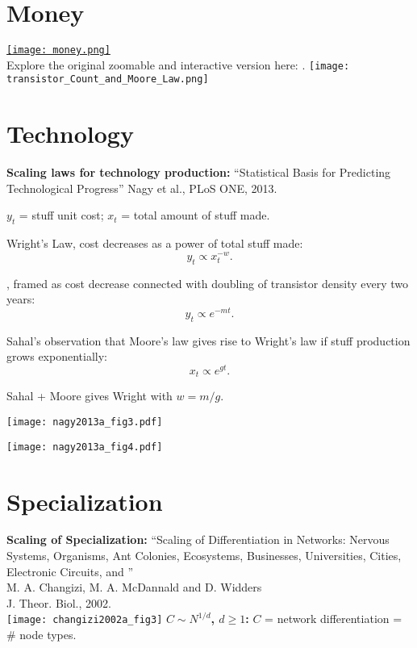 \section{Money}
  
  \href{http://xkcd.com/980/}{
    \texttt{[image: money.png]}
  }\\
  Explore the original zoomable and  interactive version here: 
  .
  \textbf{}
    \texttt{[image: transistor\_Count\_and\_Moore\_Law.png]}
\section{Technology}
  \small

  \textbf{Scaling laws for technology production:}
      ``Statistical Basis for Predicting Technological Progress\cite{nagy2013a}''
      Nagy et al., PLoS ONE, 2013.
    
      $y_t$ = stuff unit cost;
      $x_t$ = total amount of stuff made.
    
      Wright's Law, cost decreases as a power of total stuff made:\cite{wright1936a}
      $$ 
      y_t \propto x_t^{-w}.
      $$
     
      ,
      framed as cost decrease 
      connected with doubling of transistor density every two years:\cite{moore1965a}
      $$
      y_t \propto e^{- m t}. 
      $$
     
      Sahal's observation that Moore's law gives rise to Wright's law if
      stuff production grows exponentially:\cite{sahal1979a}
      $$
      x_t \propto e^{g t}.
      $$
     
      Sahal + Moore gives Wright with $w = m/g$.
  
    \begin{center}
      \texttt{[image: nagy2013a\_fig3.pdf]}
    \end{center}
  
    \texttt{[image: nagy2013a\_fig4.pdf]}
\section{Specialization}
  \textbf{Scaling of Specialization:}
    ``Scaling of Differentiation in Networks: Nervous Systems, Organisms,
    Ant Colonies, Ecosystems, Businesses, Universities, Cities, Electronic
    Circuits, and ''\\
    M. A. Changizi, M. A. McDannald and D. Widders\cite{changizi2002a}\\
    J. Theor. Biol., 2002.\\
    \texttt{[image: changizi2002a\_fig3]}
  \textbf{$C \sim N^{1/d}$, $d \ge 1$:}
      $C$ = network differentiation = \# node types.
     
